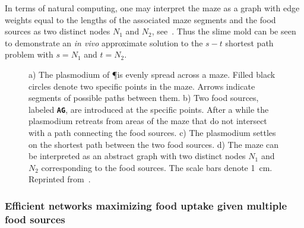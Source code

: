 			In terms of natural computing, one may interpret the maze as a graph with edge weights equal to the lengths of the associated maze segments and the food sources as two distinct nodes $N_1$ and $N_2$, see~. Thus the slime mold \Pp can be seen to demonstrate an \emph{in vivo} approximate solution to the $s-t$ shortest path problem with $s=N_1$ and $t=N_2$. 

			\begin{figure}
				\centering
				\newline
				
				\caption[Classic maze experiment with \P]{ a) The plasmodium of 
				\P is evenly spread across a maze. Filled black circles denote two specific points in the maze. Arrows indicate segments of possible paths between them. b) Two food sources, labeled \textbf{\texttt{AG}}, are introduced at the specific points. After a while the plasmodium retreats from areas of the maze that do not intersect with a path connecting the food sources. c) The plasmodium settles on the shortest path between the two food sources. d) The maze can be interpreted as an abstract graph with two distinct nodes $N_1$ and $N_2$ corresponding to the food sources. The scale bars denote \SI{1}{\centi\metre}. Reprinted from~\cite{Tero2007553}.}
				\label{fig:maze}
			\end{figure}

			\FloatBarrier

		\subsubsection{Efficient networks maximizing food uptake given multiple food sources}

